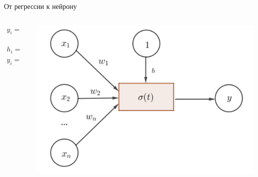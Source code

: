 \documentclass[notes,12pt, aspectratio=169]{beamer}
\begin{document}
\begin{frame}{От регрессии к нейрону}
\begin{columns}	
	\begin{column}{.35\linewidth}
		\begin{equation*} 
			\begin{aligned}
				y_i =& b + w \cdot x_i \\
				&\Downarrow \\
				h_i =& b + w \cdot x_i \\
				y_i = & f(h_i)
			\end{aligned}
		\end{equation*} 
	\end{column}
	\begin{column}{.64\linewidth}
		\begin{center}
			\includegraphics[width=.8\linewidth]{neuron_3.png}
		\end{center}
	\end{column}
\end{columns}
\end{frame}
\end{document}
